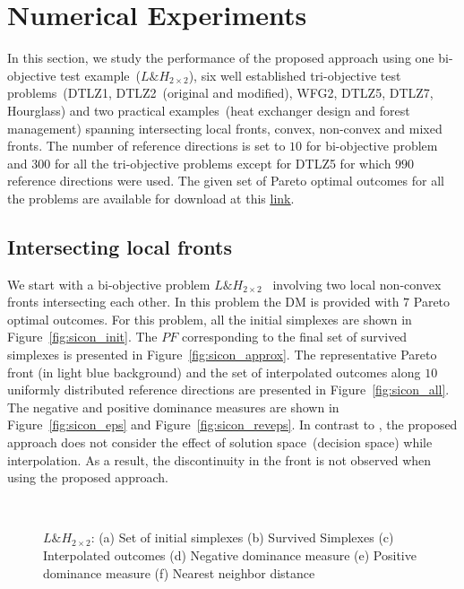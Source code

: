 \section{Numerical Experiments}
\label{sec:numex}
In this section, we study the performance of the proposed approach using one bi-objective test example~($L\&H_{2\times 2}$), six well established tri-objective test problems~(DTLZ1, DTLZ2~(original and modified), WFG2, DTLZ5, DTLZ7, Hourglass) and two practical examples~(heat exchanger design and forest management) spanning intersecting local fronts, convex, {\color{blue}non-convex} and mixed fronts. The number of reference directions is set to $10$ for bi-objective problem and $300$ for all the tri-objective problems except for DTLZ5 for which $990$ reference directions were used. The given set of Pareto optimal outcomes for all the problems are available for download at this \href{http://www.mdolab.net/Ray/Research-Data/Polytope-dataset.zip}{\underline{link}}. 

{\color{blue}\subsection{Intersecting local fronts}
	We start with a bi-objective problem $L\&H_{2\times 2}$~\cite{hartikainen2014paint} involving two local non-convex fronts intersecting each other. In this problem the DM is provided with $7$ Pareto optimal outcomes. For this problem, all the initial simplexes are shown in Figure~\ref{fig:sicon_init}. The $PF$ corresponding to the final set of survived {\color{blue}simplexes} is presented in Figure~\ref{fig:sicon_approx}. The representative Pareto front (in light blue background) and the set of interpolated outcomes along $10$ uniformly distributed reference directions are presented in Figure~\ref{fig:sicon_all}. The negative and positive dominance measures are shown in Figure~\ref{fig:sicon_eps} and Figure~\ref{fig:sicon_reveps}. In contrast to \cite{hartikainen2014paint}, the proposed approach does not consider the effect of solution space~(decision space) while interpolation. As a result, the discontinuity in the front is not observed when using the proposed approach. }

\begin{figure*}[!ht]
	\centering
	\\
	\caption{$L\&H_{2\times 2}$: (a) Set of initial {\color{blue}simplexes} (b) Survived {\color{blue}Simplexes} (c) Interpolated outcomes (d) Negative dominance measure (e) Positive dominance measure (f) Nearest neighbor distance}
	\label{fig:sicon_true_approx}
\end{figure*}

